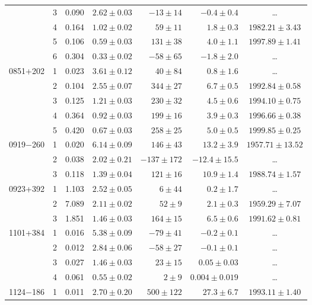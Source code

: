 \begin{table}
\begin{SingleSpace}
\begin{tabular}{l c r r r r c}
         &  3 &  0.090 & $ 2.62\pm 0.03$ & $ -13\pm  14$ & $ -0.4\pm 0.4$ & \dots \\
         &  4 &  0.164 & $ 1.02\pm 0.02$ & $  59\pm  11$ & $  1.8\pm 0.3$ & $1982.21\pm   3.43$ \\
         &  5 &  0.106 & $ 0.59\pm 0.03$ & $ 131\pm  38$ & $  4.0\pm 1.1$ & $1997.89\pm   1.41$ \\
         &  6 &  0.304 & $ 0.33\pm 0.02$ & $ -58\pm  65$ & $ -1.8\pm 2.0$ & \dots \\
0851+202 &  1 &  0.023 & $ 3.61\pm 0.12$ & $  40\pm  84$ & $  0.8\pm 1.6$ & \dots \\
         &  2 &  0.104 & $ 2.55\pm 0.07$ & $ 344\pm  27$ & $  6.7\pm 0.5$ & $1992.84\pm   0.58$ \\
         &  3 &  0.125 & $ 1.21\pm 0.03$ & $ 230\pm  32$ & $  4.5\pm 0.6$ & $1994.10\pm   0.75$ \\
         &  4 &  0.364 & $ 0.92\pm 0.03$ & $ 199\pm  16$ & $  3.9\pm 0.3$ & $1996.66\pm   0.38$ \\
         &  5 &  0.420 & $ 0.67\pm 0.03$ & $ 258\pm  25$ & $  5.0\pm 0.5$ & $1999.85\pm   0.25$ \\
0919$-$260 &  1 &  0.020 & $ 6.14\pm 0.09$ & $ 146\pm  43$ & $ 13.2\pm 3.9$ & $1957.71\pm  13.52$ \\
         &  2 &  0.038 & $ 2.02\pm 0.21$ & $-137\pm 172$ & $-12.4\pm15.5$ & \dots \\
         &  3 &  0.118 & $ 1.39\pm 0.04$ & $ 121\pm  16$ & $ 10.9\pm 1.4$ & $1988.74\pm   1.57$ \\
0923+392 &  1 &  1.103 & $ 2.52\pm 0.05$ & $   6\pm  44$ & $  0.2\pm 1.7$ & \dots \\
         &  2 &  7.089 & $ 2.11\pm 0.02$ & $  52\pm   9$ & $  2.1\pm 0.3$ & $1959.29\pm   7.07$ \\
         &  3 &  1.851 & $ 1.46\pm 0.03$ & $ 164\pm  15$ & $  6.5\pm 0.6$ & $1991.62\pm   0.81$ \\
1101+384 &  1 &  0.016 & $ 5.38\pm 0.09$ & $ -79\pm  41$ & $ -0.2\pm 0.1$ & \dots \\
         &  2 &  0.012 & $ 2.84\pm 0.06$ & $ -58\pm  27$ & $ -0.1\pm 0.1$ & \dots \\
         &  3 &  0.027 & $ 1.46\pm 0.03$ & $  23\pm  15$ & $  0.05\pm 0.03$ & \dots \\
         &  4 &  0.061 & $ 0.55\pm 0.02$ & $   2\pm   9$ & $  0.004\pm 0.019$ & \dots \\
1124$-$186 &  1 &  0.011 & $ 2.70\pm 0.20$ & $ 500\pm 122$ & $ 27.3\pm 6.7$ & $1993.11\pm   1.40$ \\

\end{tabular}
\end{SingleSpace}
\end{table}
